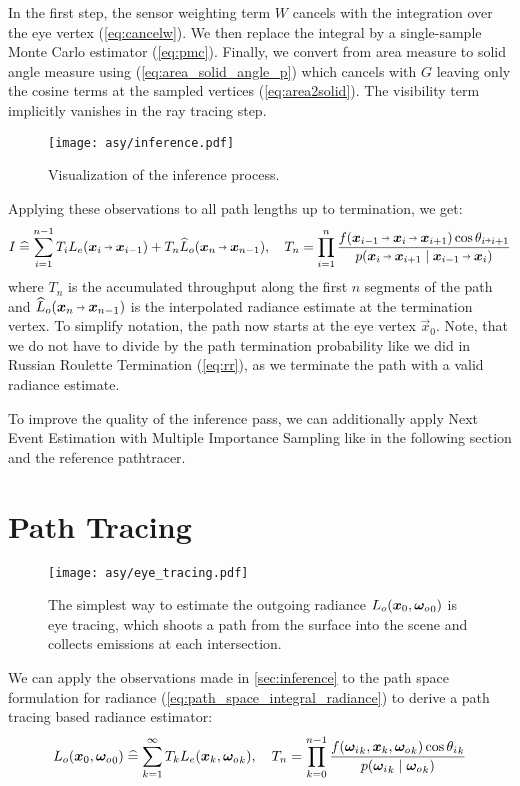 In the first step, the sensor weighting term $W$ cancels with the integration over the eye vertex (\cref{eq:cancelw}).
We then replace the integral by a single-sample Monte Carlo estimator (\cref{eq:pmc}).
Finally, we convert from area measure to solid angle measure using (\cref{eq:area_solid_angle_p}) which cancels with $G$ leaving only the cosine terms at the sampled vertices (\cref{eq:area2solid}).
The visibility term implicitly vanishes in the ray tracing step.
\begin{figure}[htb!]
    \centering
    \texttt{[image: asy/inference.pdf]}
\caption{Visualization of the inference process.}
\label{fig:inference}
\end{figure}

Applying these observations to all path lengths up to termination, we get:
\begin{equation}
\label{eq:inference}
    I
    \hateq \sum_{i=1}^{n-1} T_i L_e(\pdir{i}{i-1}) + T_n \widehat{L}_o(\pdir{n}{n-1}), \quad
    T_n
    = \prod_{i=1}^{n} \frac{f(\ptrip{i-1}{i}{i+1}) \cos \theta_{i \veryshortarrow i+1}}{p(\pdir{i}{i+1} \mid \pdir{i-1}{i})}
\end{equation}
where $T_n$ is the accumulated throughput along the first $n$ segments of the path and $\widehat{L}_o(\pdir{n}{n-1})$ is the interpolated radiance estimate at the termination vertex.
To simplify notation, the path now starts at the eye vertex $\vec{x}_0$.
Note, that we do not have to divide by the path termination probability like we did in Russian Roulette Termination (\cref{eq:rr}), as we terminate the path with a valid radiance estimate.

To improve the quality of the inference pass, we can additionally apply Next Event Estimation with Multiple Importance Sampling like in the following section and the reference pathtracer.

\section{Path Tracing}
\label{sec:re_eye}
\begin{figure}[htb!]
    \centering
    \texttt{[image: asy/eye\_tracing.pdf]}
\caption{The simplest way to estimate the outgoing radiance $L_o(\bm{x}_0, {\bm{\omega}_o}_0)$ is eye tracing, which shoots a path from the surface into the scene and collects emissions at each intersection.}
\label{fig:eye_tracing}
\end{figure}
We can apply the observations made in \cref{sec:inference} to the path space formulation for radiance (\cref{eq:path_space_integral_radiance}) to derive a path tracing based radiance estimator:
\begin{equation}
    L_o(\bm{x}_0, {\bm{\omega}_o}_0)
    \mathrel{\widehat{=}} \sum_{k=1}^{\infty} T_k L_e(\bm{x}_k, {\bm{\omega}_o}_k), \quad
    T_n
    = \prod_{k=0}^{n-1} \frac{f({\bm{\omega}_i}_k, \bm{x}_k, {\bm{\omega}_o}_k) \cos {\theta_i}_k}{p({\bm{\omega}_i}_k \mid {\bm{\omega}_o}_k)}
\end{equation}


